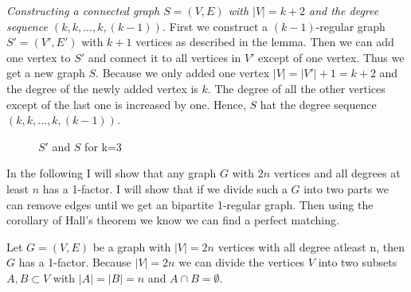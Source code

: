 \documentclass[a4paper]{article}
\begin{document}
\begin{solution}{11}
		
		\emph{Constructing a connected graph $S=(V,E)$ with $|V|=k+2$ and the degree sequence $( k,k,...,k,(k-1))$. }  
		First we construct a $(k-1)$-regular graph $S' = (V',E')$ with $k+1$ vertices as described in the lemma. 
		Then we can add one vertex to $S'$ and connect it to all vertices in $V'$ except of one vertex. 
		Thus we get a new graph $S$. 
		Because we only added one vertex $|V| = |V'| +1 = k+2$ and the degree of the newly added vertex is $k$.
		The degree of all the other vertices except of the last one is increased by one. 
		Hence, $S$ hat the degree sequence $(k,k,...,k,(k-1))$. 
		\begin{figure}[h]
			\centering
		\caption{$S'$ and $S$ for k=3}
		\end{figure}
	\end{solution}
	\newpage
	\begin{solution}{12}
	In the following I will show that any graph $G$ with $2n$ vertices and all degrees at least $n$ has a 1-factor. 	
	I will show that if we divide such a $G$ into two parts we can remove edges until we get an bipartite 1-regular graph. 
	Then using the corollary of Hall's theorem we know we can find a perfect matching.
		\begin{theorem}{Let $G=(V,E)$ be a graph with $|V| = 2n$ vertices with all degree atleast n, then $G$ has a 1-factor.}
		Because $|V| = 2n$ we can divide the vertices $V$ into two subsets $A,B \subset V$ with $|A|=|B|=n$ and $A \cap B = \emptyset$. 
		
	
		\end{theorem}
	\end{solution}
	
\end{document}
